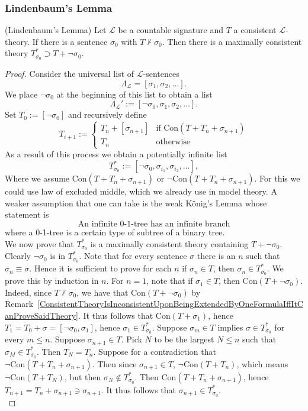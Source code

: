 \subsubsection{Lindenbaum's Lemma}
\begin{theorem}(Lindenbaum's Lemma) Let $\mathcal{L}$ be a countable signature and $T$ a consistent $\mathcal{L}$-theory. If there is a sentence $\sigma_0$ with $T\not\vdash \sigma_0$. Then there is a maximally consistent theory $T^\ast_{\sigma_0}\supset T+\neg\sigma_0$. 
\end{theorem}
\begin{proof}
    Consider the universal list of $\mathcal{L}$-sentences
    $$\Lambda_\mathcal{L} = [\sigma_1,\sigma_2,\dots].$$    
    We place $\neg \sigma_0$ at the beginning of this list to obtain a list
    $$\Lambda_\mathcal{L}' := [\neg\sigma_0,\sigma_1,\sigma_2,\dots].$$
    Set $T_0 := [\neg\sigma_0]$ and recursively define 
    $$
        T_{i+1} := 
            \begin{cases}
                T_n + [\sigma_{n+1}] & \text{if } \mathrm{Con}(T+T_n+\sigma_{n+1})\\
                T_n & \text{otherwise}
            \end{cases}
    $$
    As a result of this process we obtain a potentially infinite list 
    $$T_{\sigma_0}^\ast := [\neg\sigma_0, \sigma_{i_1},\sigma_{i_2},\dots],$$
    Where we assume $\mathrm{Con}(T+T_n+\sigma_{n+1})$ or $\neg\mathrm{Con}(T+T_n+\sigma_{n+1})$. For this we could use law of excluded middle, which we already use in model theory. A weaker assumption that one can take is the weak König's Lemma whose statement is 
    $$\text{An infinite 0-1-tree has an infinite branch}$$
    where a 0-1-tree is a certain type of subtree of a binary tree.\\
    We now prove that $T^\ast_{\sigma_0}$ is a maximally consistent theory containing $T+\neg\sigma_0$. Clearly $\neg\sigma_0$ is in $T^\ast_{\sigma_0}$. Note that for every sentence $\sigma$ there is an $n$ such that $\sigma_n\equiv \sigma$. Hence it is sufficient to prove for each $n$ if $\sigma_n\in T$, then $\sigma_n\in T^\ast_{\sigma_0}$. We prove this by induction in $n$. For $n=1$, note that if $\sigma_1\in T$, then $\mathrm{Con}(T+\neg\sigma_0)$. Indeed, since $T\not\vdash \sigma_0$, we have that $\mathrm{Con}(T+\neg \sigma_0)$ by Remark~\ref{ConsistentTheoryIsInconsistentUponBeingExtendedByOneFormulaIffItCanProveSaidTheory}. It thus follows that $\mathrm{Con}(T+\sigma_1)$, hence $T_1=T_0+\sigma = [\neg\sigma_0,\sigma_1]$, hence $\sigma_1\in T^\ast_{\sigma_0}$. Suppose $\sigma_m\in T$ implies $\sigma\in T^\ast_{\sigma_0}$ for every $m\leq n$. Suppose $\sigma_{n+1}\in T$. Pick $N$ to be the largest $N\leq n$ such that $\sigma_M\in T^\ast_{\sigma_0}$. Then $T_N=T_n$. Suppose for a contradiction that $\neg\mathrm{Con}(T+T_n+\sigma_{n+1})$. Then since $\sigma_{n+1}\in T$, $\neg\mathrm{Con}(T+T_n)$, which means $\neg\mathrm{Con}(T+T_N)$, but then $\sigma_N\notin T^\ast_{\sigma_0}$. Then $\mathrm{Con}(T+T_n+\sigma_{n+1})$, hence $T_{n+1}=T_n+\sigma_{n+1}\ni \sigma_{n+1}$. It thus follows that $\sigma_{n+1}\in T^\ast_{\sigma_0}$.\\

\end{proof}
